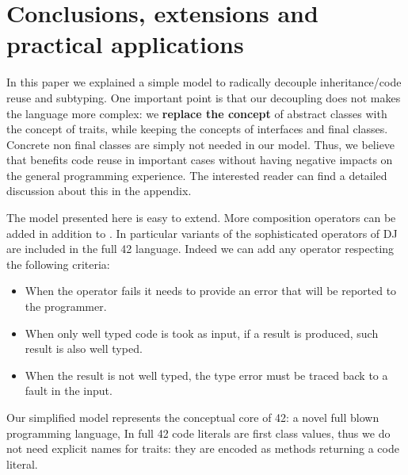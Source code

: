\saveSpace\saveSpace
\section{Conclusions, extensions and practical applications}
\saveSpace
In this paper we explained a simple model to 
radically decouple inheritance/code reuse and subtyping.
One important point is that our decoupling does not
makes the language more complex:
we \textbf{replace the concept} of abstract classes with
the concept of traits, while keeping the concepts of
interfaces and final classes.
Concrete non final classes are simply not needed in our model.
Thus, we believe that \name benefits
code reuse in important cases 
without having negative impacts on the general programming experience.
The interested reader can find a detailed discussion about this in the appendix.


The model presented here is easy to extend.
More composition operators can be added in addition to \use.
In particular variants of the sophisticated operators of DJ are
included in the full 42 language.
 Indeed we can add any operator respecting the following criteria:

\begin{itemize}
\item When the operator fails it needs to provide an error that will be reported to the programmer.
\item When only well typed code is took as input, if a result is produced,
 such result is also well typed.
\item When the result is not well typed,
the type error must be traced back to
a fault in the input.
 \end{itemize}
 

Our simplified model represents the conceptual core of  42: a novel full blown programming language,
In full 42 code literals are first class values, thus we
do not need explicit names
for traits: they are encoded as methods
 returning a code literal.

\begin{comment}
using the ideas presented in this paper to obtain reliable and understandable metaprogramming.
Formalization (in progress) for full 42 can be found at
\url{http://}\footnote{Omitted for anonymous review}. 
42 extends our model allowing
flattening to execute arbitrary computations.
In such model we do not need an explicit notion of traits: they are encoded as methods returning a code literal.
42 also has features less related to code composition, like
  a strong type system supporting aliasing mutability and circularity control,
   checked exceptions, and errors (unchecked exceptions) with strong-exception-safety.


42 do not have a finite set of composition operators; they can be
added using the built in support for native method calls. They can
be dynamically checked to verify that they are well behaved
according to our predicate, or they can be trusted to achieve
efficiency.
\end{comment}

